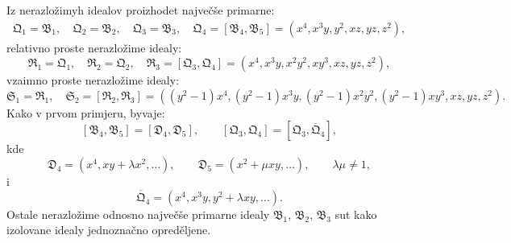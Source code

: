 \documentclass[11pt]{article}
\newcommand{\ideal}[1]{\mathfrak{#1}}
\begin{document}
Iz nerazložimyh idealov proizhodet največše primarne:
\[
\begin{gathered}
 \ideal Q_1=\ideal B_1,
 \quad \ideal Q_2=\ideal B_2,
 \quad \ideal Q_3=\ideal B_3,
 \quad
 \ideal Q_4=[\ideal B_4,\ideal B_5]=(x^4,x^3y,y^2,xz,yz,z^2),
\end{gathered}
\]
relativno proste nerazložime idealy:
\[
 \ideal R_1=\ideal Q_1,
 \quad \ideal R_2=\ideal Q_2,
 \quad
 \ideal R_3=[\ideal Q_3,\ideal Q_4]=(x^4,x^3y,x^2y^2,xy^3,xz,yz,z^2),
\]
vzaimno proste nerazložime idealy:
\[
 \ideal S_1=\ideal R_1,
 \quad \ideal S_2=[\ideal R_2,\ideal R_3]
 =((y^2-1)x^4,(y^2-1)x^3y,(y^2-1)x^2y^2,
 (y^2-1)xy^3,xz,yz,z^2).
\]
Kako v prvom primjeru, byvaje:
\[
 [\ideal B_4,\ideal B_5]=[\ideal D_4,\ideal D_5],
 \qquad
 [\ideal Q_3,\ideal Q_4]=[\ideal Q_3,
\overline{\ideal Q}_4],
\]
kde
\[
 \ideal D_4=(x^4,xy+\lambda x^2,\ldots),\qquad
 \ideal D_5=(x^2+\mu xy,\ldots),\qquad \lambda\mu\ne1,
\]
i
\[
 \overline{\ideal Q}_4=(x^4,x^3y,y^2+\lambda xy,\ldots).
\]
Ostale nerazložime odnosno največše primarne idealy \(\ideal B_1\), \(\ideal B_2\), \(\ideal B_3\) sut kako izolovane idealy jednoznačno opreděljene.
\end{document}
